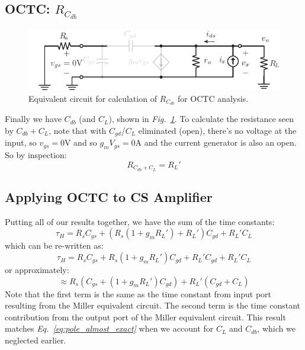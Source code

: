 \subsection{OCTC: \texorpdfstring{$R_{C_{db}}$}{Equivalent Drain-Body Capacitor Resistance}}
\begin{figure}[tb]
\centering
\includegraphics[scale=1]{cs_amp_ac_caps_Cdb}
\caption{Equivalent circuit for calculation of $R_{C_{db}}$ for OCTC analysis.} \label{fig:cs_amp_ac_caps_Cdb}
\end{figure}
Finally we have $C_{db}$ (and $C_L$), shown in \emph{Fig.~\ref{fig:cs_amp_ac_caps_Cdb}}. To calculate the resistance seen by $C_{db} + C_L$, note that with $C_{gd}$/$C_L$ eliminated (open), there's no voltage at the input, so $v_{gs} = 0$V and so $g_m V_{gs} = 0$A and the current generator is also an open.  So by inspection:
    \begin{equation}
        {R_{{C_{db}}+C_L}} = R_L'
    \end{equation}
\subsection{Applying OCTC to CS Amplifier}
Putting all of our results together, we have the sum of the time constants:
    \begin{equation} 
        {\tau _H} = R_s{C_{gs}} + \left( {R_s(1 + {g_m}R_L') + R_L'} \right){C_{gd}} + R_L'{C_L}
    \end{equation}
which can be re-written as:
    \begin{equation} 
        {\tau _H} = R_s{C_{gs}} + R_s(1 + {g_m}R_L'){C_{gd}} + R_L'{C_{gd}} + R_L'{C_L} 
    \end{equation}
or approximately:
    \begin{equation} 
        \approx R_s\left( {{C_{gs}} + (1 + {g_m}R_L'){C_{gd}}} \right) + R_L'\left( {{C_{gd}} + {C_L}} \right)
    \end{equation}
Note that the first term is the same as the time constant from input port resulting from the Miller equivalent circuit.  The second term is the time constant contribution from the output port of the Miller equivalent circuit.  This result matches \emph{Eq.~\ref{eq:pole_almost_exact}} when we account for $C_L$ and $C_{db}$, which we neglected earlier.
